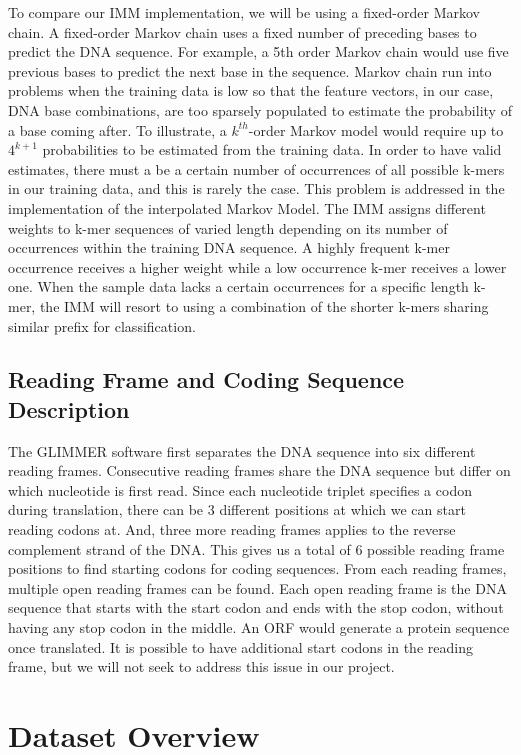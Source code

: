 \documentclass[11pt,letterpaper]{article}
\begin{document}
To compare our IMM implementation, we will be using a fixed-order Markov chain. A fixed-order Markov chain uses a fixed number of preceding bases to predict the DNA sequence. For example, a 5th order Markov chain would use five previous bases to predict the next base in the sequence. Markov chain run into problems when the training data is low so that the feature vectors, in our case, DNA base combinations, are too sparsely populated to estimate the probability of a base coming after. To illustrate, a $k^{th}$-order Markov model would require up to $4^{k+1}$ probabilities to be estimated from the training data. In order to have valid estimates, there must a be a certain number of occurrences of all possible k-mers in our training data, and this is rarely the case. This problem is addressed in the implementation of the interpolated Markov Model. The IMM assigns different weights to k-mer sequences of varied length depending on its number of occurrences within the training DNA sequence. A highly frequent k-mer occurrence receives a higher weight while a low occurrence k-mer receives a lower one. When the sample data lacks a certain occurrences for a specific length k-mer, the IMM will resort to using a combination of the shorter k-mers sharing similar prefix for classification. 


\subsection{Reading Frame and Coding Sequence Description}

The GLIMMER software first separates the DNA sequence into six different reading frames. Consecutive reading frames share the DNA sequence but differ on which nucleotide is first read. Since each nucleotide triplet specifies a codon during translation, there can be 3 different positions at which we can start reading codons at. And, three more reading frames applies to the reverse complement strand of the DNA. This gives us a total of 6 possible reading frame positions to find starting codons for coding sequences. 
From each reading frames, multiple open reading frames can be found. Each open reading frame is the DNA sequence that starts with the start codon and ends with the stop codon, without having any stop codon in the middle. An ORF would generate a protein sequence once translated. It is possible to have additional start codons in the reading frame, but we will not seek to address this issue in our project. 

\section{Dataset Overview}
\end{document}
